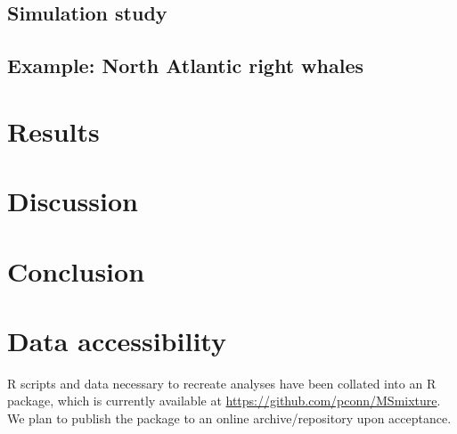 \documentclass[times,mee,doublespace,]{besauth2}
\begin{document}
\subsection{Simulation study}

\subsection{Example: North Atlantic right whales}

\section{Results}

\section{Discussion}


\section{Conclusion}



\vspace{.3in}
\section{Data accessibility}
R scripts and data necessary to recreate analyses have been collated into an R package, which is currently available at \url{https://github.com/pconn/MSmixture}.  We plan to publish the package to an online archive/repository upon acceptance. \\




\end{document}
